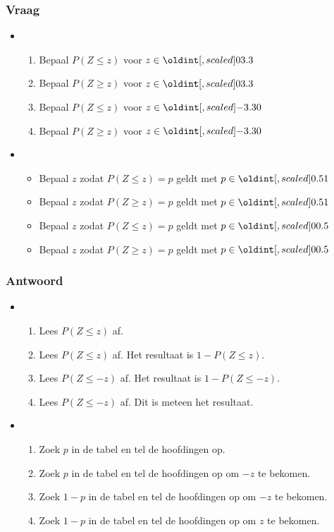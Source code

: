 \documentclass[main.tex]{subfiles}
\begin{document}
\subsubsection*{Vraag}
\begin{itemize}
\item 
  \begin{enumerate}
  \item Bepaal $P(Z \le z)$ voor $z \in\interval{0}{3.3}$
  \item Bepaal $P(Z \ge z)$ voor $z \in\interval{0}{3.3}$
  \item Bepaal $P(Z \le z)$ voor $z \in\interval{-3.3}{0}$
  \item Bepaal $P(Z \ge z)$ voor $z \in\interval{-3.3}{0}$
  \end{enumerate}
\item
  \begin{itemize}
  \item Bepaal $z$ zodat $P(Z \le z) = p$ geldt met $p \in \interval{0.5}{1}$ 
  \item Bepaal $z$ zodat $P(Z \ge z) = p$ geldt met $p \in \interval{0.5}{1}$
  \item Bepaal $z$ zodat $P(Z \le z) = p$ geldt met $p \in \interval{0}{0.5}$
  \item Bepaal $z$ zodat $P(Z \ge z) = p$ geldt met $p \in \interval{0}{0.5}$
  \end{itemize}
\end{itemize}

\subsubsection*{Antwoord}
\begin{itemize}
\item 
  \begin{enumerate}
  \item Lees $P(Z \le z)$ af.
  \item Lees $P(Z \le z)$ af. Het resultaat is $1-P(Z \le z)$.
  \item Lees $P(Z \le -z)$ af. Het resultaat is $1-P(Z \le -z)$.
  \item Lees $P(Z \le -z)$ af. Dit is meteen het resultaat.
  \end{enumerate}
\item
  \begin{enumerate}
  \item Zoek $p$ in de tabel en tel de hoofdingen op.
  \item Zoek $p$ in de tabel en tel de hoofdingen op om $-z$ te bekomen.
  \item Zoek $1-p$ in de tabel en tel de hoofdingen op om $-z$ te bekomen.
  \item Zoek $1-p$ in de tabel en tel de hoofdingen op om $z$ te bekomen.
  \end{enumerate}
\end{itemize}
\end{document}
